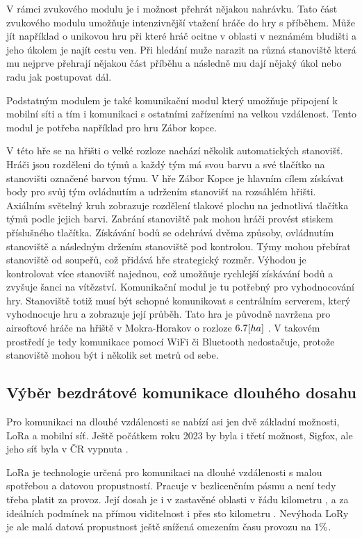 V rámci zvukového modulu je i možnost přehrát nějakou nahrávku.
Tato část zvukového modulu umožňuje intenzivnější vtažení hráče do hry s příběhem.
Může jít například o unikovou hru při které hráč ocitne v oblasti v neznámém bludišti a jeho úkolem je najít cestu ven.
Při hledání muže narazit na různá stanoviště která mu nejprve přehrají nějakou část příběhu a následně mu dají nějaký úkol nebo radu jak postupovat dál.

Podstatným modulem je také komunikační modul který umožňuje připojení k mobilní síti a tím i komunikaci s ostatními zařízeními na velkou vzdálenost.
Tento modul je potřeba například pro hru Zábor kopce.

V této hře se na hřišti o velké rozloze nachází několik automatických stanovišť.
Hráči jsou rozděleni do týmů a každý tým má svou barvu a své tlačítko na stanovišti označené barvou týmu.
V hře Zábor Kopce je hlavním cílem získávat body pro svůj tým ovládnutím a udržením stanovišť na rozsáhlém hřišti. 
Axiálním světelný kruh zobrazuje rozdělení tlakové plochu na jednotlivá tlačítka týmů podle jejich barvi.
Zabrání stanoviště pak mohou hráči provést stiskem příslušného tlačítka. 
Získávání bodů se odehrává dvěma způsoby, ovládnutím stanoviště a následným držením stanoviště pod kontrolou. 
Týmy mohou přebírat stanoviště od soupeřů, což přidává hře strategický rozměr. 
Výhodou je kontrolovat více stanovišť najednou, což umožňuje rychlejší získávání bodů a zvyšuje šanci na vítězství.
Komunikační modul je tu potřebný pro vyhodnocování hry.
Stanoviště totiž musí být schopné komunikovat s centrálním serverem, který vyhodnocuje hru a zobrazuje její průběh.
Tato hra je původně navržena pro airsoftové hráče na hřiště v Mokra-Horakov o rozloze \(6.7\-[ha]\) \cite{MokraHorakov}.
V takovém prostředí je tedy komunikace pomocí WiFi či Bluetooth nedostačuje, protože stanoviště mohou být i několik set metrů od sebe.

\subsection{Výběr bezdrátové komunikace dlouhého dosahu}
Pro komunikaci na dlouhé vzdálenosti se nabízí asi jen dvě základní možnosti, LoRa a mobilní síť.
Ještě počátkem roku 2023 by byla i třetí možnost, Sigfox, ale jeho síť byla v ČR vypnuta \cite{SigfoxKonci}.

LoRa je technologie určená pro komunikaci na dlouhé vzdálenosti s malou spotřebou a datovou propustností.
Pracuje v bezlicenčním pásmu a není tedy třeba platit za provoz.
Její dosah je i v zastavěné oblasti v řádu kilometru \cite{LoRaSEMTECH}, a za ideálních podmínek na přímou viditelnost i přes sto kilometru \cite{LoRaEMAN}. 
Nevýhoda LoRy je ale malá datová propustnost ještě snížená omezením času provozu na \(1\-\%\)\cite{LoRaEMAN}.

